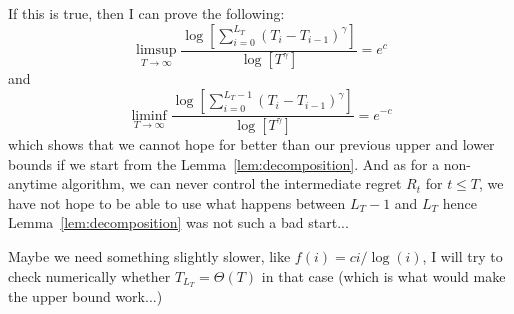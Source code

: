 \documentclass[12pt]{colt2018} %
\begin{document}
If this is true, then I can prove the following:
\[\limsup_{T\rightarrow \infty} \frac{\log\left[\sum_{i=0}^{L_T} (T_i - T_{i-1})^{\gamma}\right]}{\log [T^{\gamma}]} = e^c\]
and
\[\liminf_{T \rightarrow \infty} \frac{\log\left[\sum_{i=0}^{L_{T}-1} (T_i - T_{i-1})^{\gamma}\right]}{\log [T^{\gamma}]} = e^{-c}\]
which shows that we cannot hope for better than our previous upper and lower bounds if we start from the Lemma~\ref{lem:decomposition}. And as for a non-anytime algorithm, we can never control the intermediate regret $R_t$ for $t\leq T$, we have not hope to be able to use what happens between $L_{T} - 1$ and $L_T$ hence Lemma~\ref{lem:decomposition} was not such a bad start...


Maybe we need something slightly slower, like $f(i) = ci/\log(i)$, I will try to check numerically whether $T_{L_T} = \Theta(T)$ in that case (which is what would make the upper bound work...)
\end{document}
